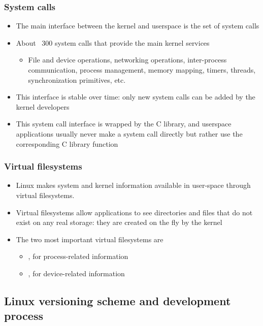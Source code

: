 \begin{frame}
  \frametitle{System calls}
  \begin{itemize}
  \item The main interface between the kernel and userspace is the set
    of system calls
  \item About ~300 system calls that provide the main kernel services
    \begin{itemize}
    \item File and device operations, networking operations,
      inter-process communication, process management, memory mapping,
      timers, threads, synchronization primitives, etc.
    \end{itemize}
  \item This interface is stable over time: only new system calls can
    be added by the kernel developers
  \item This system call interface is wrapped by the C library, and
    userspace applications usually never make a system call directly
    but rather use the corresponding C library function
  \end{itemize}
\end{frame}

\begin{frame}
  \frametitle{Virtual filesystems}
  \begin{itemize}
  \item Linux makes system and kernel information available in
    user-space through virtual filesystems.
  \item Virtual filesystems allow applications to see directories and
    files that do not exist on any real storage: they are created on the
    fly by the kernel
  \item The two most important virtual filesystems are
    \begin{itemize}
    \item {}, for process-related information
    \item {}, for device-related information
    \end{itemize}
  \end{itemize}
\end{frame}

\subsection{Linux versioning scheme and development process}

